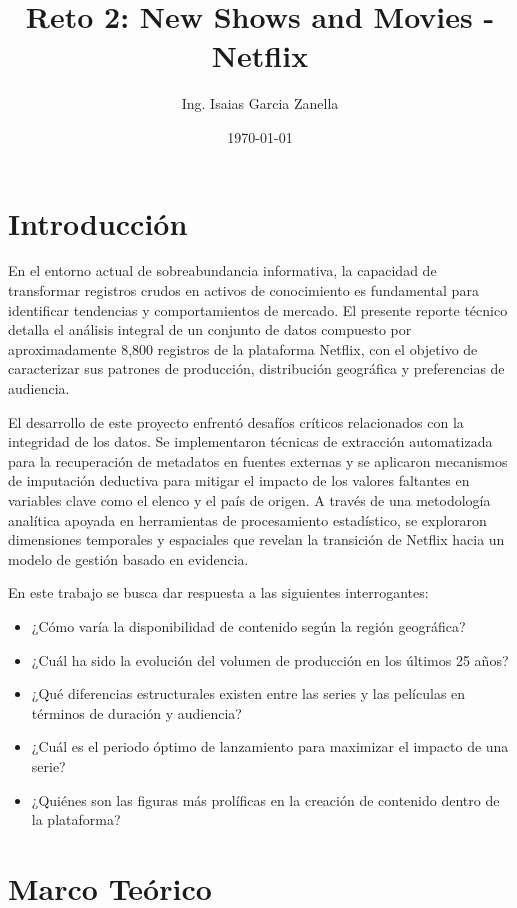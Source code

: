 \documentclass[12pt]{article}
\title{Reto 2: New Shows and Movies - Netflix}
\author{Ing. Isaias Garcia Zanella}
\date{\today}
\begin{document}
\maketitle

\section{Introducción}

En el entorno actual de sobreabundancia informativa, la capacidad de transformar registros crudos en activos de conocimiento es fundamental para identificar tendencias y comportamientos de mercado. El presente reporte técnico detalla el análisis integral de un conjunto de datos compuesto por aproximadamente 8,800 registros de la plataforma Netflix, con el objetivo de caracterizar sus patrones de producción, distribución geográfica y preferencias de audiencia.

El desarrollo de este proyecto enfrentó desafíos críticos relacionados con la integridad de los datos. Se implementaron técnicas de extracción automatizada para la recuperación de metadatos en fuentes externas y se aplicaron mecanismos de imputación deductiva para mitigar el impacto de los valores faltantes en variables clave como el elenco y el país de origen. A través de una metodología analítica apoyada en herramientas de procesamiento estadístico, se exploraron dimensiones temporales y espaciales que revelan la transición de Netflix hacia un modelo de gestión basado en evidencia.

En este trabajo se busca dar respuesta a las siguientes interrogantes:
\begin{itemize}
    \item ¿Cómo varía la disponibilidad de contenido según la región geográfica?
    \item ¿Cuál ha sido la evolución del volumen de producción en los últimos 25 años?
    \item ¿Qué diferencias estructurales existen entre las series y las películas en términos de duración y audiencia?
    \item ¿Cuál es el periodo óptimo de lanzamiento para maximizar el impacto de una serie?
    \item ¿Quiénes son las figuras más prolíficas en la creación de contenido dentro de la plataforma?
\end{itemize}
\vspace{2cm}
\section{Marco Teórico}
\end{document}
